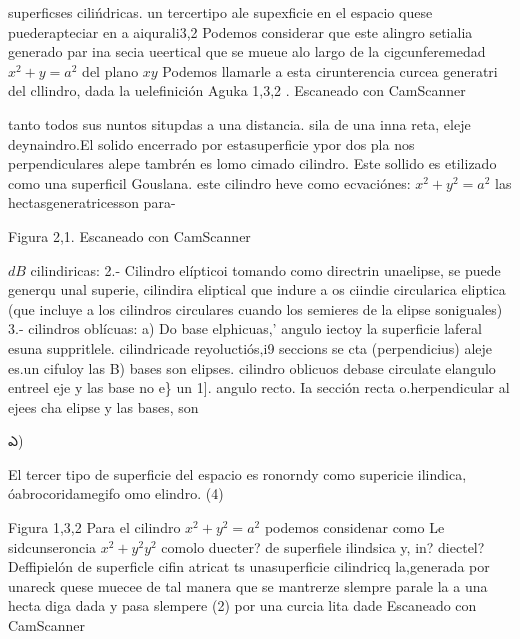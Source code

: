 

superficses cilińdricas.
un tercertipo ale supexficie en el espacio quese puederapteciar en a aiqurali3,2 Podemos considerar que este alingro setialia generado par ina secia ueertical que se mueue alo largo de la cigcunferemedad $x^2+y=a^2$ del plano $x y$ Podemos llamarle a esta cirunterencia curcea generatri del cllindro, dada la uelefinición
Aguka 1,3,2
.
Escaneado con CamScanner




tanto todos sus nuntos situpdas a una distancia. sila de una inna reta, eleje deynaindro.El solido encerrado por estasuperficie ypor dos pla nos perpendiculares alepe tambrén es lomo cimado cilindro. Este sollido es etilizado como una superficil Gouslana.
este cilindro heve como ecvaciónes: $x^2+y^2=a^2$ las hectasgeneratricesson para-

Figura 2,1.
Escaneado con CamScanner





$d B$
cilindiricas:
2.- Cilindro elípticoi tomando como directrin
unaelipse, se puede generqu unal superie,
cilindira eliptical que indure a os ciindie circularica eliptica (que incluye a los cilindros circulares cuando los semieres de la elipse
soniguales) 3.- cilindros oblícuas:
a) Do base elphicuas,' angulo iectoy la superficie laferal esuna suppritlele. cilindricade reyoluctiós,i9 seccions se cta (perpendicius) aleje es.un cifuloy las
B) bases son elipses.
cilindro oblicuos debase circulate elangulo entreel eje y las base no e\} un
1].
angulo recto. Ia sección recta o.herpendicular al ejees cha elipse y las bases, son




ఎ)

El tercer tipo de superficie del espacio es ronorndy como supericie ilindica, óabrocoridamegifo omo elindro.
(4)

Figura 1,3,2
Para el cilindro $x^2+y^2=a^2$ podemos considenar como Le sidcunseroncia $x^2+y^2 y^2$ comolo duecter? de superfiele ilindsica y, in? diectel?
Deffipielón de superficle cifin atricat ts unasuperficie cilindricq la,generada por unareck quese muecee de tal manera que se mantrerze slempre parale la a una hecta diga dada y pasa slempere
(2)
por una curcia lita dade
Escaneado con CamScanner




